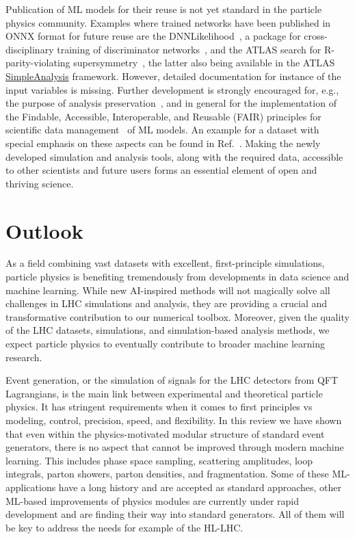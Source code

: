 \documentclass[submission,Phys]{SciPost}
\begin{document}
Publication of ML models for their reuse is not yet standard in the particle physics community. Examples where trained networks have been published in ONNX format for future reuse are the DNNLikelihood~\cite{coccaro_andrea_2019_3567822}, a package for cross-disciplinary training of discriminator networks~\cite{Benato:2021olt}, and the ATLAS search for R-parity-violating supersymmetry~\cite{ATLAS:2021fbt,hepdata.104860.v1/r3}, the latter also being available in the ATLAS \href{https://gitlab.cern.ch/atlas-sa/simple-analysis}{SimpleAnalysis} framework. However, detailed documentation for instance of the input variables is missing. Further development is strongly encouraged for, e.g., the purpose of analysis preservation~\cite{LHCReinterpretationForum:2020xtr,snowmass:preservation}, and in general for the implementation of the Findable, Accessible, Interoperable, and Reusable (FAIR) principles for scientific data management~\cite{FAIR-paper} of  ML models. An example for a dataset with special emphasis on these aspects can be found in Ref.~\cite{Chen:2021euv}. Making the newly developed simulation and analysis tools, along with the required data, accessible to other scientists and future users forms an essential element of open and thriving science.

\section{Outlook}

As a field combining vast datasets with excellent, first-principle simulations, particle physics is benefiting tremendously from developments in data science and machine learning. While new AI-inspired methods will not magically solve all challenges in LHC simulations and analysis, they are providing a crucial and transformative contribution to our numerical toolbox. Moreover, given the quality of the LHC datasets, simulations, and simulation-based analysis methods, we expect particle physics to eventually contribute to broader machine learning research.

Event generation, or the simulation of signals for the LHC detectors from QFT Lagrangians, is the main link between experimental and theoretical particle physics. It has stringent requirements when it comes to first principles vs modeling, control, precision, speed, and flexibility. In this review we have shown that even within the physics-motivated modular structure of standard event generators, there is no aspect that cannot be improved through modern machine learning. This includes phase space sampling, scattering amplitudes, loop integrals, parton showers, parton densities, and fragmentation. Some of these ML-applications have a long history and are accepted as standard approaches, other ML-based improvements of physics modules are currently under rapid development and are finding their way into standard generators. All of them will be key to address the needs for example of the HL-LHC.
\end{document}

